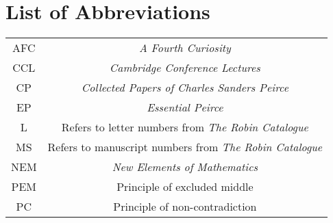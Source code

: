 \dedication{For the poor tortoise, who had to wait while Achilles took all his teeny tiny little steps.}

\tableofcontents

\chapter{List of Abbreviations}

\begin{center}
\begin{tabular}{ c c } 

 AFC & \textit{A Fourth Curiosity} \\ 
 CCL & \textit{Cambridge Conference Lectures} \\ 
 CP & \textit{Collected Papers of Charles Sanders Peirce} \\
 EP & \textit{Essential Peirce} \\ 
 L & Refers to letter numbers from \textit{The Robin Catalogue}\\ 
 MS & Refers to manuscript numbers from \textit{The Robin Catalogue}\\ 
 NEM & \textit{New Elements of Mathematics} \cite{peirce1976new} \\ 
 PEM & Principle of excluded middle \\ 
 PC & Principle of non-contradiction \\ 
\end{tabular}
\end{center}





